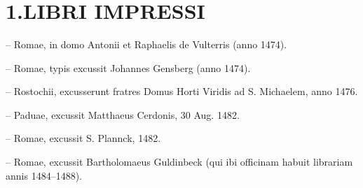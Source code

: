 \documentclass[a5paper,twoside]{article}
\renewcommand\Large{\fontsize{12.5}{13} \selectfont}
\begin{document}


\frenchspacing

\fontsize{11}{13.2}
\selectfont

\linespread{1.1}

\setlength{\parindent}{7mm}

\setcounter{page}{169}

\title{\Large{\MakeUppercase{Fontes lectionvm}}}

\date{}%

\maketitle 

\thispagestyle{empty}


\section*{1.\thinspace LIBRI IMPRESSI}
\begin{description}[nolistsep,itemsep=3pt,font=\rmfamily]
\item[V] -- Romae, in domo Antonii et Raphaelis de Vulterris (anno 1474).
\item[Ge] -- Romae, typis excussit Johannes Gensberg (anno 1474).
\item[R] -- Rostochii, excusserunt fratres Domus Horti Viridis ad S. Michaelem, anno 1476.
\item[C] -- Paduae, excussit Matthaeus Cerdonis, 30 Aug. 1482.
\item[P] -- Romae, excussit S. Plannck, 1482.
\item[Gd] -- Romae, excussit Bartholomaeus Guldinbeck (qui ibi officinam habuit librariam annis 1484–1488).
\end{description}
\end{document}
